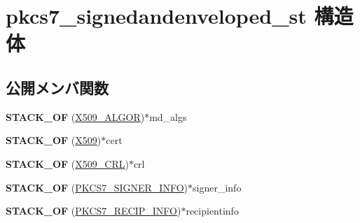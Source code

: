 \hypertarget{structpkcs7__signedandenveloped__st}{}\section{pkcs7\+\_\+signedandenveloped\+\_\+st 構造体}
\label{structpkcs7__signedandenveloped__st}
\subsection*{公開メンバ関数}
\begin{DoxyCompactItemize}
\item 
\hypertarget{structpkcs7__signedandenveloped__st_ac087476fa26a6ca86cc3a476a1fb1b08}{}{\bfseries S\+T\+A\+C\+K\+\_\+\+O\+F} (\hyperlink{struct_x509__algor__st}{X509\+\_\+\+A\+L\+G\+O\+R})$\ast$md\+\_\+algs\label{structpkcs7__signedandenveloped__st_ac087476fa26a6ca86cc3a476a1fb1b08}

\item 
\hypertarget{structpkcs7__signedandenveloped__st_a1da5d9733cf881dc6268a35e43468045}{}{\bfseries S\+T\+A\+C\+K\+\_\+\+O\+F} (\hyperlink{structx509__st}{X509})$\ast$cert\label{structpkcs7__signedandenveloped__st_a1da5d9733cf881dc6268a35e43468045}

\item 
\hypertarget{structpkcs7__signedandenveloped__st_a5fe37928a5d1d77475394498801e13ce}{}{\bfseries S\+T\+A\+C\+K\+\_\+\+O\+F} (\hyperlink{struct_x509__crl__st}{X509\+\_\+\+C\+R\+L})$\ast$crl\label{structpkcs7__signedandenveloped__st_a5fe37928a5d1d77475394498801e13ce}

\item 
\hypertarget{structpkcs7__signedandenveloped__st_ace1e90a030d77ba8eb28e32eea02ef5c}{}{\bfseries S\+T\+A\+C\+K\+\_\+\+O\+F} (\hyperlink{structpkcs7__signer__info__st}{P\+K\+C\+S7\+\_\+\+S\+I\+G\+N\+E\+R\+\_\+\+I\+N\+F\+O})$\ast$signer\+\_\+info\label{structpkcs7__signedandenveloped__st_ace1e90a030d77ba8eb28e32eea02ef5c}

\item 
\hypertarget{structpkcs7__signedandenveloped__st_a776fcc6d73b4a25d83e96faf6cb364c9}{}{\bfseries S\+T\+A\+C\+K\+\_\+\+O\+F} (\hyperlink{structpkcs7__recip__info__st}{P\+K\+C\+S7\+\_\+\+R\+E\+C\+I\+P\+\_\+\+I\+N\+F\+O})$\ast$recipientinfo\label{structpkcs7__signedandenveloped__st_a776fcc6d73b4a25d83e96faf6cb364c9}

\end{DoxyCompactItemize}
